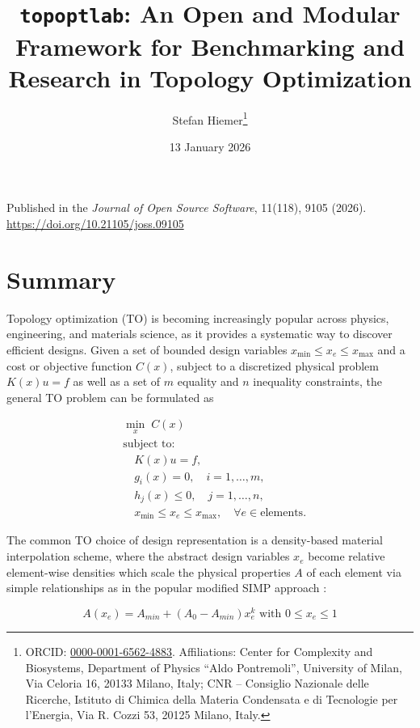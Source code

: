 \documentclass[11pt]{article}
\title{\texttt{topoptlab}: An Open and Modular Framework for Benchmarking and Research in Topology Optimization}
\author{
  Stefan Hiemer\thanks{ORCID: \href{https://orcid.org/0000-0001-6562-4883}{0000-0001-6562-4883}. Affiliations: Center for Complexity and Biosystems, Department of Physics ``Aldo Pontremoli'', University of Milan, Via Celoria 16, 20133 Milano, Italy; CNR -- Consiglio Nazionale delle Ricerche, Istituto di Chimica della Materia Condensata e di Tecnologie per l'Energia, Via R. Cozzi 53, 20125 Milano, Italy.}
}
\date{13 January 2026}
\begin{document}
\maketitle

\begin{center}
\footnotesize
Published in the \emph{Journal of Open Source Software}, 11(118), 9105 (2026).\\
\url{https://doi.org/10.21105/joss.09105}
\end{center}

\vspace{1em}

\section*{Summary}

Topology optimization (TO) is becoming increasingly popular across physics,
engineering, and materials science, as it provides a systematic way to discover
efficient designs. Given a set of bounded design variables
$x_{\min} \leq x_e \leq x_{\max}$ and a cost or objective function $C(x)$,
subject to a discretized physical problem $K(x) u = f$ as well as a set of
$m$ equality and $n$ inequality constraints, the general TO problem can be
formulated as

\begin{equation*}
\begin{aligned}
& \min_{x} \; C(x) \\
& \text{subject to:} \\
& \quad K(x) u = f, \\
& \quad g_i(x) = 0, \quad i = 1, \ldots, m, \\
& \quad h_j(x) \leq 0, \quad j = 1, \ldots, n, \\
& \quad x_{\min} \leq x_e \leq x_{\max}, \quad \forall e \in \text{elements}.
\end{aligned}
\end{equation*}

The common TO choice of design representation is a density-based material
interpolation scheme, where the abstract design variables $x_e$ become relative
element-wise densities which scale the physical properties $A$ of each element
via simple relationships as in the popular modified SIMP approach \citep{sigmund2007morphology}:

\begin{equation*}
A(x_e) = A_{min} + (A_{0}-A_{min})x_{e}^{k}\text{ with }0\leq x_e\leq 1
\end{equation*}
\end{document}
